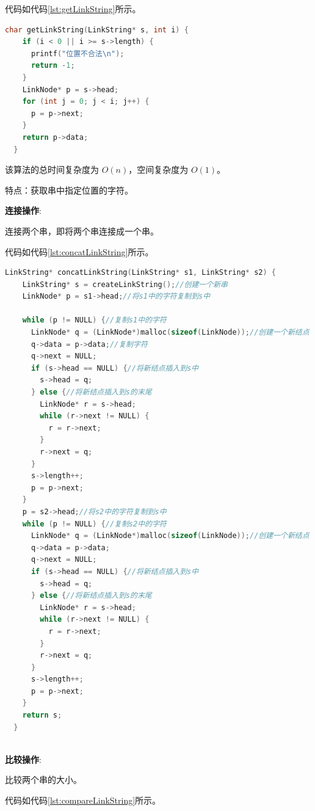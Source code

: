 \documentclass[lang=cn,newtx,10pt,scheme=chinese]{elegantbook}
\begin{document}
代码如代码\ref{lst:getLinkString}所示。

\begin{lstlisting}[language=C++, caption={获取串中指定位置的字符示例代码}, label={lst:getLinkString}]
  char getLinkString(LinkString* s, int i) {
    if (i < 0 || i >= s->length) {
      printf("位置不合法\n");
      return -1;
    }
    LinkNode* p = s->head;
    for (int j = 0; j < i; j++) {
      p = p->next;
    }
    return p->data;
  }

\end{lstlisting}

该算法的总时间复杂度为 $O(n)$，空间复杂度为 $O(1)$。

特点：获取串中指定位置的字符。

\textbf{连接操作}:

连接两个串，即将两个串连接成一个串。

代码如代码\ref{lst:concatLinkString}所示。

\begin{lstlisting}[language=C++, caption={连接两个串示例代码}, label={lst:concatLinkString}]
  LinkString* concatLinkString(LinkString* s1, LinkString* s2) {
    LinkString* s = createLinkString();//创建一个新串
    LinkNode* p = s1->head;//将s1中的字符复制到s中
    
    while (p != NULL) {//复制s1中的字符
      LinkNode* q = (LinkNode*)malloc(sizeof(LinkNode));//创建一个新结点
      q->data = p->data;//复制字符
      q->next = NULL;
      if (s->head == NULL) {//将新结点插入到s中
        s->head = q;
      } else {//将新结点插入到s的末尾
        LinkNode* r = s->head;
        while (r->next != NULL) {
          r = r->next;
        }
        r->next = q;
      }
      s->length++;
      p = p->next;
    }
    p = s2->head;//将s2中的字符复制到s中
    while (p != NULL) {//复制s2中的字符
      LinkNode* q = (LinkNode*)malloc(sizeof(LinkNode));//创建一个新结点
      q->data = p->data;
      q->next = NULL;
      if (s->head == NULL) {//将新结点插入到s中
        s->head = q;
      } else {//将新结点插入到s的末尾
        LinkNode* r = s->head;
        while (r->next != NULL) {
          r = r->next;
        }
        r->next = q;
      }
      s->length++;
      p = p->next;
    }
    return s;
  }



\end{lstlisting}


\textbf{比较操作}:

比较两个串的大小。

代码如代码\ref{lst:compareLinkString}所示。
\end{document}
